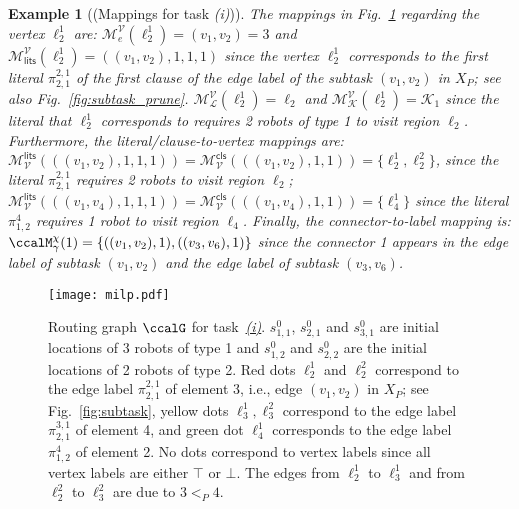 \documentclass[Afour,sageh,times]{sagej}
\newtheorem{exmp}{Example}
\renewcommand{\ap}[3]{\mathcal{\pi}_{{#1},{#2}}^{#3}}
\newenvironment{cexmp}
{\addtocounter{exmp}{-1}\begin{exmp}}
  {\end{exmp}}
\begin{document}
\begin{cexmp}[(Mappings for task {\it (i)})]
    The mappings in Fig.~\ref{fig:milp} regarding the vertex $\ell_2^{1}$ are:
    $\mathcal{M}_e^{\mathcal{V}}(\ell_{2}^{1})  = (v_1,v_2) = 3$ and $\mathcal{M}_{\mathsf{lits}}^{\mathcal{V}}(\ell_{2}^{1})  = ((v_1,v_2), 1, 1, 1)$ since the vertex $\ell_2^{1}$ corresponds to the first literal $\ap{2}{1}{2,1}$ of the first clause of the edge label of the subtask $(v_1, v_2)$ in $X_P$; see also Fig.~\ref{fig:subtask_prune}.  $\mathcal{M}_\mathcal{L}^{\mathcal{V}}(\ell_{2}^{1})  = \ell_2$  and $\mathcal{M}_\mathcal{K}^{\mathcal{V}}(\ell_{2}^{1})  = \mathcal{K}_1$ since the literal that $\ell_2^1$ corresponds to requires 2 robots of type 1 to visit region $\ell_2$. Furthermore,  the literal/clause-to-vertex mappings are:
    $\mathcal{M}^{\mathsf{lits}}_{\mathcal{V}}(((v_1,v_2), 1, 1, 1)) = \mathcal{M}^{\mathsf{cls}}_{\mathcal{V}}(((v_1,v_2), 1, 1))  = \{\ell_2^{1}, \ell_2^{2}\}$, since the literal $\ap{2}{1}{2,1}$ requires 2 robots to visit region $\ell_2$; $\mathcal{M}^{\mathsf{lits}}_{\mathcal{V}}(((v_1,v_4), 1, 1, 1)) = \mathcal{M}^{\mathsf{cls}}_{\mathcal{V}}(((v_1,v_4), 1, 1))  = \{\ell_4^{1}\}$ since the literal $\ap{1}{2}{4}$ requires 1 robot to visit region $\ell_4$. Finally, the connector-to-label mapping is: $\ccalM^{\chi}_{\gamma} (1)  = \{((v_1, v_2), 1), ((v_3, v_6), 1)\}$ since the connector 1 appears in the edge label of subtask $(v_1 ,v_2)$ and the edge label of subtask $(v_3, v_6)$.
   \end{cexmp}
\begin{figure}[t]
  \centering
  \texttt{[image: milp.pdf]}
  \caption{Routing graph $\ccalG$ for task~\hyperref[task:i]{\it (i)}. $s^0_{1,1}$, $s^0_{2,1}$ and $s^0_{3,1}$ are initial locations of 3 robots of type 1 and $s^0_{1,2}$ and $s^0_{2,2}$ are the initial locations of 2 robots of type 2. Red dots $\ell_{2}^{1}$ and $\ell_{2}^{2}$ correspond to the edge label $\ap{2}{1}{2,1}$ of element 3, i.e., edge $(v_1, v_2)$ in $X_P$; see Fig.~\ref{fig:subtask}, yellow dots $\ell_{3}^{1}, \ell_{3}^{2}$ correspond to the edge label $\ap{2}{1}{3,1}$ of element 4, and green dot $\ell_{4}^{1}$ corresponds to the edge label $\ap{1}{2}{4}$ of element 2. No dots correspond to vertex labels since all vertex labels are either $\top$ or $\bot$.  The edges from $\ell_2^{1}$ to $\ell_3^{1}$ and from $\ell_2^{2}$  to $\ell_3^{2}$ are due to $3 <_{P} 4$. }
    \label{fig:milp}
\end{figure}
\end{document}
